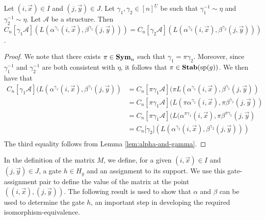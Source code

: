 \documentclass[../paper.tex]{subfiles}
\begin{document}
\begin{lem}
	\label{lem:alpha-ind-gamma}
	Let $(i,\vec{x}) \in I$ and $(j, \vec{y}) \in J$. Let $\gamma_1, \gamma_2 \in
  [n]^{\underline{U}}$ be such that $\gamma^{-1}_1 \sim \eta$ and $\gamma^{-1}_2
  \sim \eta$. Let $\mathcal{A}$ be a structure. Then $C_n[\gamma_1 \mathcal{A}]
  (L(\alpha^{\gamma_1}(i, \vec{x}), \beta^{\gamma_1}(j, \vec{y}))) =
  C_n[\gamma_2 \mathcal{A}] (L(\alpha^{\gamma_2}(i, \vec{x}),
  \beta^{\gamma_2}(j, \vec{y})))$.
\end{lem}
\begin{proof}
	We note that there exists $\pi \in \text{\textbf{Sym}}_n$ such that $\gamma_1 = \pi
  \gamma_2$. Moreover, since $\gamma^{-1}_1$ and $\gamma^{-1}_2$ are both
  consistent with $\eta$, it follows that $\pi \in \text{\textbf{Stab}} (\text{sp} (g))$. We then have
  that
	\begin{align*}
		C_n[\gamma_1 \mathcal{A}](L(\alpha^{\gamma_1}(i, \vec{x}), \beta^{\gamma_1}(j,
		\vec{y})) & = C_n[\pi \gamma_1 \mathcal{A}](\pi L(\alpha^{\gamma_1}(i, \vec{x}), 
                \beta^{\gamma_1}(j, \vec{y})) \\
		          & = C_n[\pi \gamma_1 \mathcal{A}](L(\pi                                
                \alpha^{\gamma_1}(i, \vec{x}), \pi \beta^{\gamma_1}(j, \vec{y}))\\
		          & = C_n[\pi                                                            
                \gamma_1 \mathcal{A}](L(\alpha^{\pi \gamma_1}(i, \vec{x}), \pi \beta^{\pi
                \gamma_1}(j, \vec{y})\\
		          & = C_n[\gamma_2 \mathcal] (L(\alpha^{\gamma_2}(i,                     
                \vec{x}), \beta^{\gamma_2}(j, \vec{y})))\\
	\end{align*}The third equality follows from Lemma \ref{lem:alpha-and-gamma}.
\end{proof}

In the definition of the matrix $M$, we define, for a given $(i, \vec{x}) \in I$
and $(j, \vec{y}) \in J$, a gate $h \in H_g$ and an assignment to its support.
We use this gate-assignment pair to define the value of the matrix at the point
$((i, \vec{x}), (j, \vec{y}))$. The following result is used to show that
$\alpha$ and $\beta$ can be used to determine the gate $h$, an important step in
developing the required isomorphism-equivalence.
\end{document}
